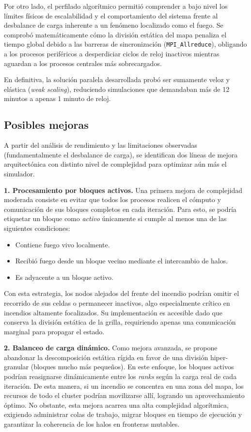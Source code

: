\documentclass[10pt,a4paper]{article}
\begin{document}
Por otro lado, el perfilado algorítmico permitió comprender a bajo nivel los límites físicos de escalabilidad y el comportamiento del sistema frente al desbalance de carga inherente a un fenómeno localizado como el fuego. Se comprobó matemáticamente cómo la división estática del mapa penaliza el tiempo global debido a las barreras de sincronización (\texttt{MPI\_Allreduce}), obligando a los procesos periféricos a desperdiciar ciclos de reloj inactivos mientras aguardan a los procesos centrales más sobrecargados.

En definitiva, la solución paralela desarrollada probó ser sumamente veloz y elástica (\textit{weak scaling}), reduciendo simulaciones que demandaban más de 12 minutos a apenas 1 minuto de reloj.

\subsection{Posibles mejoras}
A partir del análisis de rendimiento y las limitaciones observadas (fundamentalmente el desbalance de carga), se identifican dos líneas de mejora arquitectónica con distinto nivel de complejidad para optimizar aún más el simulador.

\textbf{1. Procesamiento por bloques activos.} Una primera mejora de complejidad moderada consiste en evitar que todos los procesos realicen el cómputo y comunicación de sus bloques completos en cada iteración. Para esto, se podría etiquetar un bloque como \textit{activo} únicamente si cumple al menos una de las siguientes condiciones:
\begin{itemize}
    \item Contiene fuego vivo localmente.
    \item Recibió fuego desde un bloque vecino mediante el intercambio de halos.
    \item Es adyacente a un bloque activo.
\end{itemize}
Con esta estrategia, los nodos alejados del frente del incendio podrían omitir el recorrido de sus celdas o permanecer inactivos, algo especialmente crítico en incendios altamente focalizados. Su implementación es accesible dado que conserva la división estática de la grilla, requiriendo apenas una comunicación marginal para propagar el estado.

\textbf{2. Balanceo de carga dinámico.} Como mejora avanzada, se propone abandonar la descomposición estática rígida en favor de una división hiper-granular (bloques mucho más pequeños). En este enfoque, los bloques activos podrían reasignarse dinámicamente entre los \textit{ranks} según la carga real de cada iteración. De esta manera, si un incendio se concentra en una zona del mapa, los recursos de todo el cluster podrían movilizarse allí, logrando un aprovechamiento óptimo. No obstante, esta mejora acarrea una alta complejidad algorítmica, exigiendo administrar colas de trabajo, migrar bloques en tiempo de ejecución y garantizar la coherencia de los halos en fronteras mutables.
\end{document}
